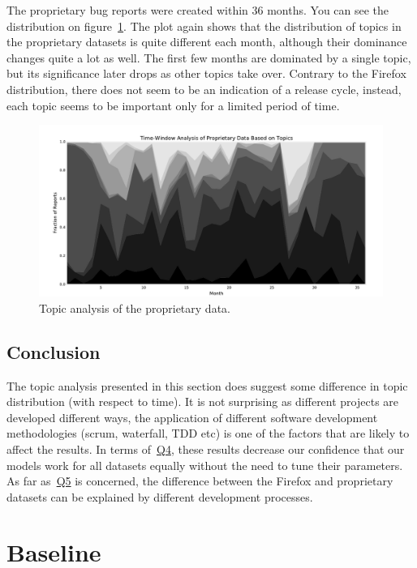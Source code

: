 The proprietary bug reports were created within 36 months. You can see the distribution on figure~\ref{fig:distribution.prop.topic}. The plot again shows that the distribution of topics in the proprietary datasets is quite different each month, although their dominance changes quite a lot as well. The first few months are dominated by a single topic, but its significance later drops as other topics take over. Contrary to the Firefox distribution, there does not seem to be an indication of a release cycle, instead, each topic seems to be important only for a limited period of time.

\begin{figure}[htbp]
    \centering
        \includegraphics[width=\textwidth]{./images/topic_component_distribution/proprietary_topic_10.pdf}
    \caption{Topic analysis of the proprietary data.}
    \label{fig:distribution.prop.topic}
\end{figure}

\subsection{Conclusion}

The topic analysis presented in this section does suggest some difference in topic distribution (with respect to time). It is not surprising as different projects are developed different ways, the application of different software development methodologies (scrum, waterfall, TDD etc) is one of the factors that are likely to affect the results. In terms of~\hyperlink{question:4}{Q4}, these results decrease our confidence that our models work for all datasets equally without the need to tune their parameters. As far as~\hyperlink{question:5}{Q5} is concerned, the difference between the Firefox and proprietary datasets can be explained by different development processes.

\section{Baseline}
\label{section:baseline}

